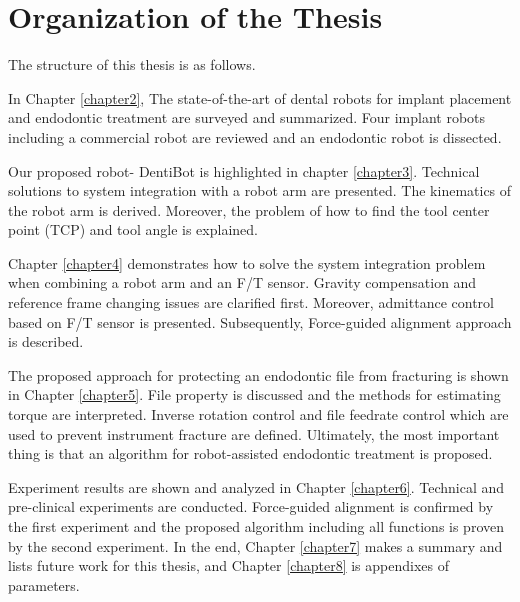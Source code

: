 \section{Organization of the Thesis}
\hspace*{6mm}The structure of this thesis is as follows.
\par
In Chapter \ref{chapter2}, The state-of-the-art of dental robots for implant placement and endodontic treatment are surveyed and summarized. Four implant robots including a commercial robot are reviewed and an endodontic robot is dissected. 
\par
Our proposed robot- DentiBot is highlighted in chapter \ref{chapter3}. Technical solutions to system integration with a robot arm are presented. The kinematics of the robot arm is derived. Moreover, the problem of how to find the tool center point (TCP) and tool angle is explained.  
\par
Chapter \ref{chapter4} demonstrates how to solve the system integration problem when combining a robot arm and an F/T sensor. Gravity compensation and reference frame changing issues are clarified first. Moreover, admittance control based on F/T sensor is presented. Subsequently, Force-guided alignment approach is described.  
\par
The proposed approach for protecting an endodontic file from fracturing is shown in Chapter \ref{chapter5}. File property is discussed and the methods for estimating torque are interpreted. Inverse rotation control and file feedrate control which are used to prevent instrument fracture are defined. Ultimately, the most important thing is that an algorithm for robot-assisted endodontic treatment is proposed.
\par
Experiment results are shown and analyzed in Chapter \ref{chapter6}. Technical and pre-clinical experiments are conducted. Force-guided alignment is confirmed by the first experiment and the proposed algorithm including all functions is proven by the second experiment.
In the end, Chapter \ref{chapter7} makes a summary and lists future work for this thesis, and Chapter \ref{chapter8} is appendixes of parameters.